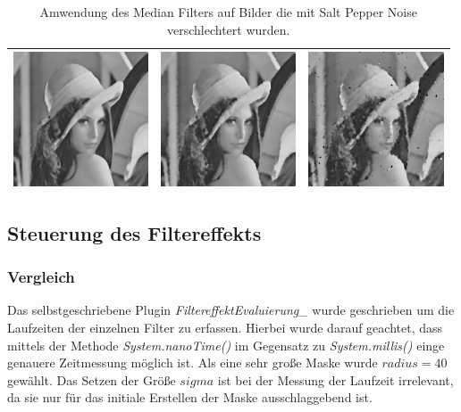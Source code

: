 \documentclass[12pt,german]{article}
\begin{document}
\begin{table}[H]
\begin{tabular}{| c | c | c |}
	\hline
	\includegraphics[width=4cm]{../testData/Median/LenaMedian.jpg} & \includegraphics[width=4cm]{../testData/Median/LenaNoiseR4.jpg} & \includegraphics[width=4cm]{../testData/Median/LenaNoisyNoiseR4.jpg} \\
	\hline

  \end{tabular}
  \caption{Amwendung des Median Filters auf Bilder die mit Salt Pepper Noise verschlechtert wurden.}
  \label{tab:Statistics}
\end{table}





\newpage
\subsection{Steuerung des Filtereffekts }

\subsubsection{Vergleich}
Das selbstgeschriebene Plugin \textit{FiltereffektEvaluierung\_} wurde geschrieben um die Laufzeiten der einzelnen Filter zu erfassen. Hierbei wurde darauf geachtet, dass mittels der Methode \textit{System.nanoTime()} im Gegensatz zu \textit{System.millis()} einge genauere Zeitmessung möglich ist. Als eine sehr große Maske wurde $  radius = 40 $ gewählt. Das Setzen der Größe $ sigma $ ist bei der Messung der Laufzeit irrelevant, da sie nur für das initiale Erstellen der Maske ausschlaggebend ist. \\
\end{document}
